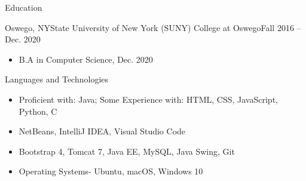 \documentclass[]{johnsoncv}
\begin{document}
	\makeheader
	
	
	\begin{cvsection}{Education}
		\begin{cvsubsection}{Oswego, NY}{State University of New York (SUNY) College at Oswego}{Fall 2016 – Dec. 2020}
			\begin{itemize}
				\item B.A in Computer Science, Dec. 2020
			\end{itemize}
		\end{cvsubsection}
	\end{cvsection}

	\begin{cvsection}{Languages and Technologies}
		\begin{cvsubsection}{}{}{}	
			\begin{itemize}
				\item Proficient with: Java; Some Experience with: HTML, CSS, JavaScript, Python, C
				\item NetBeans, IntelliJ IDEA, Visual Studio Code
				\item Bootstrap 4, Tomcat 7, Java EE, MySQL, Java Swing, Git
				\item Operating Systems- Ubuntu, macOS, Windows 10
			\end{itemize}
		\end{cvsubsection}
	\end{cvsection}

\end{document}
